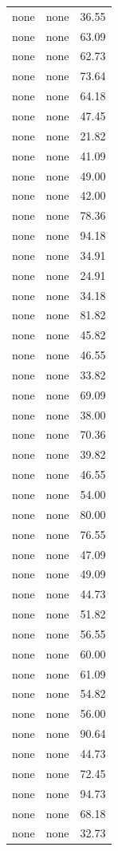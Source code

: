 \begin{tabular}{rrr}
none & none & 36.55 \\
none & none & 63.09 \\
none & none & 62.73 \\
none & none & 73.64 \\
none & none & 64.18 \\
none & none & 47.45 \\
none & none & 21.82 \\
none & none & 41.09 \\
none & none & 49.00 \\
none & none & 42.00 \\
none & none & 78.36 \\
none & none & 94.18 \\
none & none & 34.91 \\
none & none & 24.91 \\
none & none & 34.18 \\
none & none & 81.82 \\
none & none & 45.82 \\
none & none & 46.55 \\
none & none & 33.82 \\
none & none & 69.09 \\
none & none & 38.00 \\
none & none & 70.36 \\
none & none & 39.82 \\
none & none & 46.55 \\
none & none & 54.00 \\
none & none & 80.00 \\
none & none & 76.55 \\
none & none & 47.09 \\
none & none & 49.09 \\
none & none & 44.73 \\
none & none & 51.82 \\
none & none & 56.55 \\
none & none & 60.00 \\
none & none & 61.09 \\
none & none & 54.82 \\
none & none & 56.00 \\
none & none & 90.64 \\
none & none & 44.73 \\
none & none & 72.45 \\
none & none & 94.73 \\
none & none & 68.18 \\
none & none & 32.73 \\

\end{tabular}
